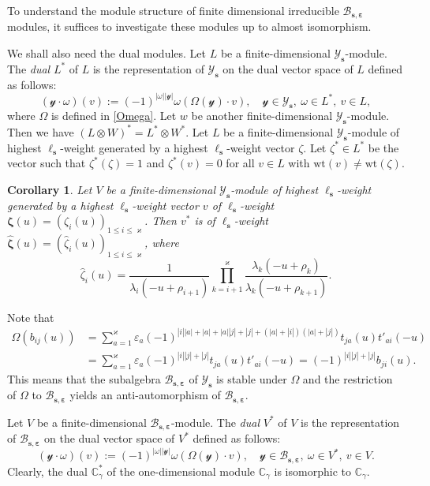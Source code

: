 \documentclass[11pt,reqno]{amsart}
\numberwithin{equation}{section}
\newtheorem{cor}[thm]{Corollary}
\theoremstyle{definition}
\theoremstyle{remark}
\newcommand{\C}{\mathbb{C}}
\newcommand{\mc}{\mathcal}
\newcommand{\lle}{\leqslant}
\newcommand{\la}{\lambda}
\newcommand{\YglMN}{\mathscr{Y}_{\bm s}}
\newcommand{\YMN}{{\mathscr{Y}_{\bm s}}}
\newcommand{\BMN}{{\mathscr{B}_{\bm s,\bm \ve}}}
\newcommand{\wt}{\widehat}
\newcommand{\ka}{\varkappa}
\newcommand{\ve}{\varepsilon}
\newcommand{\s}{{\bm s}}
\begin{document}
To understand the module structure of finite dimensional irreducible $\BMN$ modules, it suffices to investigate these modules up to almost isomorphism.

We shall also need the dual modules.
Let $L$ be a finite-dimensional $\YglMN$-module. The \textit{dual} $L^*$ of $L$ is the representation of $\YglMN$ on the dual vector space of $L$ defined as follows:
\[
(\mc y\cdot \omega)(v):=(-1)^{|\omega||\mc y|}\omega(\Omega(\mc y)\cdot v),\quad  \mc y\in \YglMN,\ \omega\in L^* ,\ v\in L,
\]
where $\Omega$ is defined in \eqref{Omega}. Let $w$ be another finite-dimensional $\YglMN$-module. Then we have $(L\otimes W)^*=L^*\otimes W^*$.                                                                            Let $L$ be a finite-dimensional $\YglMN$-module of highest $\ell_\s$-weight generated by a highest $\ell_\s$-weight vector $\zeta$. Let $\zeta^*\in L^*$ be the vector such that $\zeta^*(\zeta)=1$ and $\zeta^*(v)=0$ for all $v\in L$ with $\mathrm{wt}(v)\ne \mathrm{wt}(\zeta)$. %

\begin{cor}\label{cor dual weight}
Let $V$ be a finite-dimensional $\YglMN$-module of highest $\ell_\s$-weight generated by a highest $\ell_\s$-weight vector $v$ of $\ell_\s$-weight $\bm\zeta(u)=(\zeta_i(u))_{1\lle i\lle \ka}$. Then $v^*$ is of $\ell_\s$-weight $\wt{\bm{\zeta}}(u)=(\wt\zeta_i(u))_{1\lle i\lle \ka}$, where
\[
\wt\zeta_i(u)=\frac{1}{\la_{i}(-u+\rho_{i+1})}\prod_{k=i+1}^\ka \frac{\la_k(-u+\rho_k)}{\la_{k}(-u+\rho_{k+1})}.
\]
\end{cor}

Note that
\begin{align*}
\Omega(b_{ij}(u))&=\sum_{a=1}^\ka\ve_a(-1)^{|i||a|+|a|+|a||j|+|j|+(|a|+|i|)(|a|+|j|)}t_{ja}(u)t'_{ai}(-u)\\
&= \sum_{a=1}^\ka\ve_a(-1)^{|i||j|+|j|}t_{ja}(u)t'_{ai}(-u)=(-1)^{|i||j|+|j|}b_{ji}(u).
\end{align*}
This means that the subalgebra $\BMN$ of $\YMN$ is stable under $\Omega$ and the restriction of $\Omega$ to $\BMN$ yields an anti-automorphism of $\BMN$.

Let $V$ be a finite-dimensional $\BMN$-module. The \textit{dual} $V^*$ of $V$ is the representation of $\BMN$ on the dual vector space of $V^*$ defined as follows:
\[
(\mc y\cdot \omega)(v):=(-1)^{|\omega||\mc y|}\omega(\Omega(\mc y)\cdot v),\quad  \mc y\in \BMN,\ \omega\in V^* ,\ v\in V.
\]
Clearly, the dual $\C_{\gamma}^*$ of the one-dimensional module $\C_{\gamma}$ is isomorphic to $\C_\gamma$.
\end{document}
